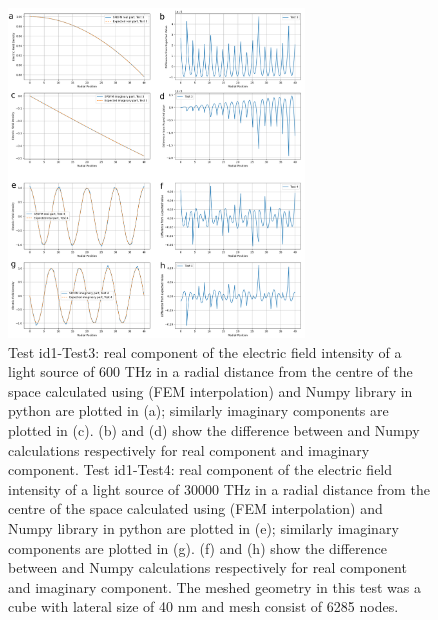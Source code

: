 \documentclass[12pt, titlepage]{article}
\begin{document}
\begin{enumerate}
    \begin{figure} \centering \includegraphics[width=0.7\textwidth]{R3-test1-test3-4.png}
    	\caption{Test id1-Test3: real component of the electric field intensity of a light source of 600 THz in a radial distance from the centre of the space calculated using \progname{} (FEM interpolation) and Numpy library in python are plotted in (a); similarly imaginary components are plotted in (c). (b) and (d) show the difference between \progname{} and Numpy calculations respectively for real component and imaginary component. Test id1-Test4: real component of the electric field intensity of a light source of 30000 THz in a radial distance from the centre of the space calculated using \progname{} (FEM interpolation) and Numpy library in python are plotted in (e); similarly imaginary components are plotted in (g). (f) and (h) show the difference between \progname{} and Numpy calculations respectively for real component and imaginary component. The meshed geometry in this test was a cube with lateral size of 40 nm and mesh consist of 6285 nodes.} \label{test1test-3-4}
    \end{figure}





\end{enumerate}
\end{document}
